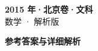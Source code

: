 \documentclass[zihao=-4, a4paper]{ctexart}
\begin{document}
\begin{center}
  {\Large\bfseries 2015 年·北京卷·文科}\\[4pt]
  {\large 数学 · 解析版}
\end{center}
\medskip
{}

\clearpage
{}
\begin{center}{\Large\bfseries 参考答案与详细解析}\end{center}
\medskip

\end{document}
